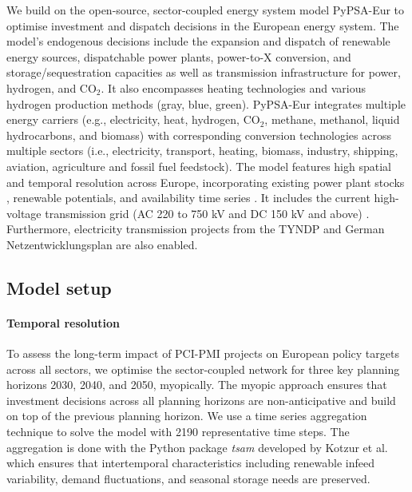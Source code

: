 \documentclass[pdflatex,sn-nature]{sn-jnl}%
\theoremstyle{thmstyleone}%
\theoremstyle{thmstyletwo}%
\theoremstyle{thmstylethree}%
\begin{document}
We build on the open-source, sector-coupled energy system model PyPSA-Eur \cite{neumannPotentialRoleHydrogen2023,frysztackiComparisonClusteringMethods2022,glaumOffshorePowerHydrogen2024,horschPyPSAEurOpenOptimisation2018} to optimise investment and dispatch decisions in the European energy system. The model's endogenous decisions include the expansion and dispatch of renewable energy sources, dispatchable power plants, power-to-X conversion, and storage/sequestration capacities as well as transmission infrastructure for power, hydrogen, and CO$_2$. It also encompasses heating technologies and various hydrogen production methods (gray, blue, green).
PyPSA-Eur integrates multiple energy carriers (e.g., electricity, heat, hydrogen, CO$_2$, methane, methanol, liquid hydrocarbons, and biomass) with corresponding conversion technologies across multiple sectors (i.e., electricity, transport, heating, biomass, industry, shipping, aviation, agriculture and fossil fuel feedstock). The model features high spatial and temporal resolution across Europe, incorporating existing power plant stocks \cite{gotzensPerformingEnergyModelling2019}, renewable potentials, and availability time series \cite{hofmannAtliteLightweightPython2021}. It includes the current high-voltage transmission grid (AC 220 to 750 kV and DC 150 kV and above) \cite{xiongModellingHighvoltageGrid2025}. Furthermore, electricity transmission projects from the TYNDP \cite{entso-eTenYearNetworkDevelopment2020} and German Netzentwicklungsplan \cite{bnetzaBestaetigungNetzentwicklungsplanStrom2024} are also enabled.

\subsection{Model setup}\label{sec:model_setup}

\paragraph{Temporal resolution}\label{sec:temporal_resolution}
To assess the long-term impact of PCI-PMI projects on European policy targets across all sectors, we optimise the sector-coupled network for three key planning horizons 2030, 2040, and 2050, myopically. The myopic approach ensures that investment decisions across all planning horizons are non-anticipative and build on top of the previous planning horizon. We use a time series aggregation technique to solve the model with 2190 representative time steps. The aggregation is done with the Python package \textit{tsam} developed by Kotzur et al. \cite{kotzurImpactDifferentTime2018} which ensures that intertemporal characteristics including renewable infeed variability, demand fluctuations, and seasonal storage needs are preserved.
\end{document}
